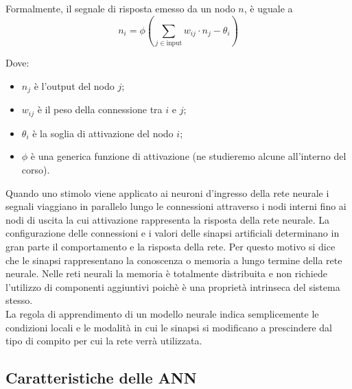 Formalmente, il segnale di risposta emesso da un nodo $n$, è uguale a
\begin{equation}
	n_i = \phi(\sum_{j \in \text{input}} w_{ij} \cdot n_j - \theta_i)
\end{equation}

Dove:
\begin{itemize}
	\item $n_j$ è l'output del nodo $j$;
	\item $w_{ij}$ è il peso della connessione tra $i$ e $j$;
	\item $\theta_i$ è la soglia di attivazione del nodo $i$;
	\item $\phi$ è una generica funzione di attivazione (ne studieremo alcune
	      all'interno del corso).
\end{itemize}

Quando uno stimolo viene applicato ai neuroni d'ingresso della rete neurale i
segnali viaggiano in parallelo lungo le connessioni attraverso i nodi interni
fino ai nodi di uscita la cui attivazione rappresenta la risposta della rete
neurale.
La configurazione delle connessioni e i valori delle sinapsi artificiali
determinano in gran parte il comportamento e la risposta della rete. Per questo
motivo si dice che le sinapsi rappresentano la conoscenza o memoria a lungo
termine della rete neurale. Nelle reti neurali la memoria è totalmente
distribuita e non richiede l'utilizzo di componenti aggiuntivi poichè è una
proprietà intrinseca del sistema stesso.\\
La regola di apprendimento di un modello neurale indica semplicemente le
condizioni locali e le modalità in cui le sinapsi si modificano a prescindere
dal tipo di compito per cui la rete verrà utilizzata.

\subsection{Caratteristiche delle ANN}


